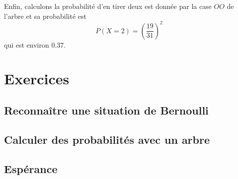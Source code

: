 Enfin, calculons la probabilité d'en tirer deux est donnée par la case \( OO\) de l'arbre et sa probabilité est
\begin{equation}
    P(X=2)=\left( \frac{ 19 }{ 31 } \right)^2
\end{equation}
qui est environ \( 0.37\).

\section{Exercices }

\subsection{Reconnaître une situation de Bernoulli}


\subsection{Calculer des probabilités avec un arbre}


\subsection{Espérance}


